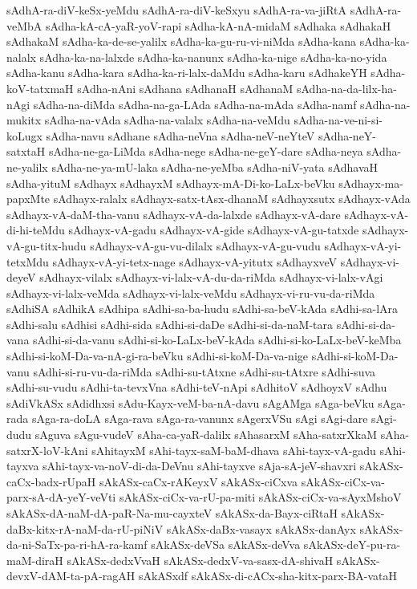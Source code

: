 {sAdhA-ra-diV-keSx-yeMdu
sAdhA-ra-diV-keSxyu
sAdhA-ra-va-jiRtA
sAdhA-ra-veMbA
sAdha-kA-cA-yaR-yoV-rapi
sAdha-kA-nA-midaM
sAdhaka
sAdhakaH
sAdhakaM
sAdha-ka-de-se-yalilx
sAdha-ka-gu-ru-vi-niMda
sAdha-kana
sAdha-ka-nalalx
sAdha-ka-na-lalxde
sAdha-ka-nanunx
sAdha-ka-nige
sAdha-ka-no-yida
sAdha-kanu
sAdha-kara
sAdha-ka-ri-lalx-daMdu
sAdha-karu
sAdhakeYH
sAdha-koV-tatxmaH
sAdha-nAni
sAdhana
sAdhanaH
sAdhanaM
sAdha-na-da-lilx-ha-nAgi
sAdha-na-diMda
sAdha-na-ga-LAda
sAdha-na-mAda
sAdha-namf
sAdha-na-mukitx
sAdha-na-vAda
sAdha-na-valalx
sAdha-na-veMdu
sAdha-na-ve-ni-si-koLugx
sAdha-navu
sAdhane
sAdha-neVna
sAdha-neV-neYteV
sAdha-neY-satxtaH
sAdha-ne-ga-LiMda
sAdha-nege
sAdha-ne-geY-dare
sAdha-neya
sAdha-ne-yalilx
sAdha-ne-ya-mU-laka
sAdha-ne-yeMba
sAdha-niV-yata
sAdhavaH
sAdha-yituM
sAdhayx
sAdhayxM
sAdhayx-mA-Di-ko-LaLx-beVku
sAdhayx-ma-papxMte
sAdhayx-ralalx
sAdhayx-satx-tAsx-dhanaM
sAdhayxsutx
sAdhayx-vAda
sAdhayx-vA-daM-tha-vanu
sAdhayx-vA-da-lalxde
sAdhayx-vA-dare
sAdhayx-vA-di-hi-teMdu
sAdhayx-vA-gadu
sAdhayx-vA-gide
sAdhayx-vA-gu-tatxde
sAdhayx-vA-gu-titx-hudu
sAdhayx-vA-gu-vu-dilalx
sAdhayx-vA-gu-vudu
sAdhayx-vA-yi-tetxMdu
sAdhayx-vA-yi-tetx-nage
sAdhayx-vA-yitutx
sAdhayxveV
sAdhayx-vi-deyeV
sAdhayx-vilalx
sAdhayx-vi-lalx-vA-du-da-riMda
sAdhayx-vi-lalx-vAgi
sAdhayx-vi-lalx-veMda
sAdhayx-vi-lalx-veMdu
sAdhayx-vi-ru-vu-da-riMda
sAdhiSA
sAdhikA
sAdhipa
sAdhi-sa-ba-hudu
sAdhi-sa-beV-kAda
sAdhi-sa-lAra
sAdhi-salu
sAdhisi
sAdhi-sida
sAdhi-si-daDe
sAdhi-si-da-naM-tara
sAdhi-si-da-vana
sAdhi-si-da-vanu
sAdhi-si-ko-LaLx-beV-kAda
sAdhi-si-ko-LaLx-beV-keMba
sAdhi-si-koM-Da-va-nA-gi-ra-beVku
sAdhi-si-koM-Da-va-nige
sAdhi-si-koM-Da-vanu
sAdhi-si-ru-vu-da-riMda
sAdhi-su-tAtxne
sAdhi-su-tAtxre
sAdhi-suva
sAdhi-su-vudu
sAdhi-ta-tevxVna
sAdhi-teV-nApi
sAdhitoV
sAdhoyxV
sAdhu
sAdiVkASx
sAdidhxsi
sAdu-Kayx-veM-ba-nA-davu
sAgAMga
sAga-beVku
sAga-rada
sAga-ra-doLA
sAga-rava
sAga-ra-vanunx
sAgerxVSu
sAgi
sAgi-dare
sAgi-dudu
sAguva
sAgu-vudeV
sAha-ca-yaR-dalilx
sAhasarxM
sAha-satxrXkaM
sAha-satxrX-loV-kAni
sAhitayxM
sAhi-tayx-saM-baM-dhava
sAhi-tayx-vA-gadu
sAhi-tayxva
sAhi-tayx-va-noV-di-da-DeVnu
sAhi-tayxve
sAja-sA-jeV-shavxri
sAkASx-caCx-badx-rUpaH
sAkASx-caCx-rAKeyxV
sAkASx-ciCxva
sAkASx-ciCx-va-parx-sA-dA-yeY-veVti
sAkASx-ciCx-va-rU-pa-miti
sAkASx-ciCx-va-sAyxMshoV
sAkASx-dA-naM-dA-paR-Na-mu-cayxteV
sAkASx-da-Bayx-ciRtaH
sAkASx-daBx-kitx-rA-naM-da-rU-piNiV
sAkASx-daBx-vasayx
sAkASx-danAyx
sAkASx-da-ni-SaTx-pa-ri-hA-ra-kamf
sAkASx-deVSa
sAkASx-deVva
sAkASx-deY-pu-ra-maM-diraH
sAkASx-dedxVvaH
sAkASx-dedxV-va-sasx-dA-shivaH
sAkASx-devxV-dAM-ta-pA-ragAH
sAkASxdf
sAkASx-di-cACx-sha-kitx-parx-BA-vataH
}
